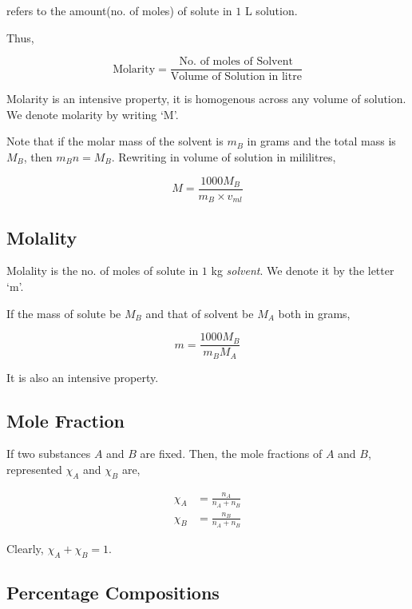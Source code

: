  refers to the amount(no. of moles) of solute in \(1\) \si{\liter} solution.

Thus, 

\[\text{Molarity} = \frac{\text{No. of moles of Solvent}}{\text{Volume of Solution in litre}}\]

Molarity is an intensive property, it is homogenous across any volume of solution. 
We denote molarity by writing `M'. 

Note that if the molar mass of the solvent is \(m_B\) in grams and the total mass is 
\(M_B\), then \(m_Bn = M_B\). Rewriting in volume of solution in mililitres,

\begin{equation}
  M = \frac{1000 M_B}{m_B \times v_{ml}}
\end{equation}

\subsection{Molality}

Molality is the no. of moles of solute in \(1\) \si{\kg} \emph{solvent}.
We denote it by the letter `m'.

If the mass of solute be \(M_B\) and that of solvent be \(M_A\) both in grams,

\begin{equation}
    m = \frac{1000M_B}{m_B M_A}
\end{equation}

It is also an intensive property.

\subsection{Mole Fraction}

If two substances \(A\) and \(B\) are fixed. Then, the mole fractions of 
\(A\) and \(B\), represented \(\chi_{A}\) and \(\chi_{B}\) are,

\begin{align*}
  \chi_A &= \frac{n_A}{n_A + n_B} \\
  \chi_B &= \frac{n_B}{n_A + n_B}
\end{align*}

Clearly, \(\chi_A + \chi_B = 1\).

\subsection{Percentage Compositions}

